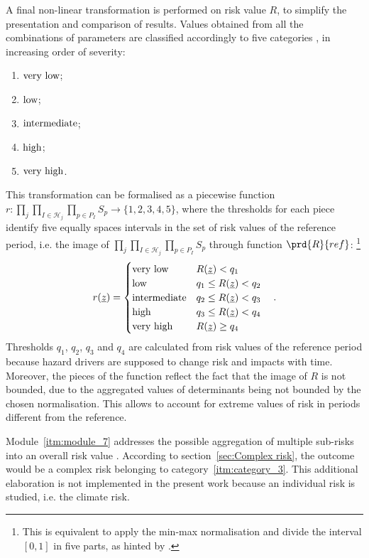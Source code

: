 A final non-linear transformation is performed on \gls{risk} value $R$, to simplify the presentation and comparison of results.
Values obtained from all the combinations of parameters are classified accordingly to five categories \cite[53]{2017GIZRiskSupplement}, in increasing order of severity:
\begin{enumerate}
  \item $\text{very low}$;
  \item $\text{low}$;
  \item $\text{intermediate}$;
  \item $\text{high}$;
  \item $\text{very high}$.
\end{enumerate}
This transformation can be formalised as a piecewise function $r : \prod_j \prod_{I \in \mathcal{H}_j} \prod_{p \in P_I} S_p \to \{ 1, 2, 3, 4, 5 \}$, where the thresholds for each piece identify five equally spaces intervals in the set of risk values of the reference period, i.e. the image of $\prod_j \prod_{I \in \mathcal{H}_j} \prod_{p \in P_I} S_p$ through function $\prd{R}{ref}$:%
\footnote{This is equivalent to apply the min-max normalisation and divide the interval $[0, 1]$ in five parts, as hinted by \cite[74]{2017GIZVulnerabilitySourcebook}.}
\begin{equation}
  \label{eq:risk_categorical}
  r(\underline{z}) =
  \begin{cases}
    \text{very low} & R(\underline{z}) < q_1 \\
    \text{low} & q_1 \le R(\underline{z}) < q_2 \\
    \text{intermediate} & q_2 \le R(\underline{z}) < q_3 \\
    \text{high} & q_3 \le R(\underline{z}) < q_4 \\
    \text{very high} & R(\underline{z}) \ge q_4
  \end{cases}
  \quad .
\end{equation}
Thresholds $q_1$, $q_2$, $q_3$ and $q_4$ are calculated from risk values of the reference period because \gls{hazard} \glspl{driver} are supposed to change risk and \glspl{impact} with time. Moreover, the pieces of the function reflect the fact that the image of $R$ is not bounded, due to the aggregated values of \glspl{determinant} being not bounded by the chosen normalisation. This allows to account for extreme values of risk in periods different from the reference.

Module~\ref{itm:module_7} addresses the possible aggregation of multiple sub-risks into an overall \gls{risk} value \cite[54]{2017GIZRiskSupplement}. According to section~\ref{sec:Complex risk}, the outcome would be a complex risk belonging to category~\ref{itm:category_3}.
This additional elaboration is not implemented in the present work because an individual \gls{risk} is studied, i.e. the climate risk.



